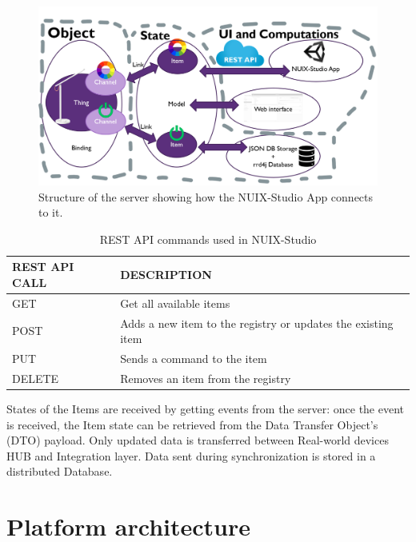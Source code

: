 \begin{figure}
  \centering
  \includegraphics[width=0.9\linewidth]{figures/ExtendedServerStructure.png}
  \caption{Structure of the server showing how the NUIX-Studio App connects to it.}
  \label{fig:ExtendedServerStructure-figure}
\end{figure}

\begin{table}
  \centering
  \begin{threeparttable}[c]
    \caption{REST API commands used in NUIX-Studio}
    \label{tab:rest-api-table}
    \begin{tabular}{ll}
      \toprule
      REST API CALL    &         DESCRIPTION                 \\
      \midrule
      GET\tnote{a} & Get all available items \\
      POST\tnote{b} & Adds a new item to the registry or updates the existing item    \\
      PUT\tnote{b}        & Sends a command to the item                              \\
      DELETE\tnote{b}        & Removes an item from the registry          \\
      \bottomrule
    \end{tabular}
  \end{threeparttable}
\end{table}

States of the Items are received by getting events from the server: once the event is received, the Item state can be retrieved from the Data Transfer Object's (DTO) payload. Only updated data is transferred between Real-world devices HUB and Integration layer. Data sent during synchronization is stored in a distributed Database.


\section{Platform architecture}

